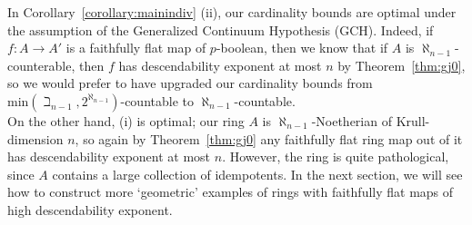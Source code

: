 In Corollary~\ref{corollary:mainindiv} (ii), our cardinality bounds are optimal under the assumption of the Generalized Continuum Hypothesis (GCH). 
Indeed, if $f: A \to A'$ is a faithfully flat map of $p$-boolean, then we know that if $A$ is $\aleph_{n-1}$-counterable, 
then $f$ has descendability exponent at most $n$ by Theorem~\ref{thm:gj0}, so we would prefer to have upgraded our cardinality bounds from
$\text{min}(\beth_{n-1}, 2^{\aleph_{n-1}})$-countable to $\aleph_{n-1}$-countable.\\
\indent On the other hand, (i) is optimal; our ring $A$ is $\aleph_{n-1}$-Noetherian of Krull-dimension $n$, so again by Theorem~\ref{thm:gj0} 
any faithfully flat ring map out of it has descendability exponent at most $n$. However, the ring is quite pathological, since $A$ contains
a large collection of idempotents. In the next section, we will see how to construct more `geometric' examples of rings with faithfully flat maps of high descendability exponent.
